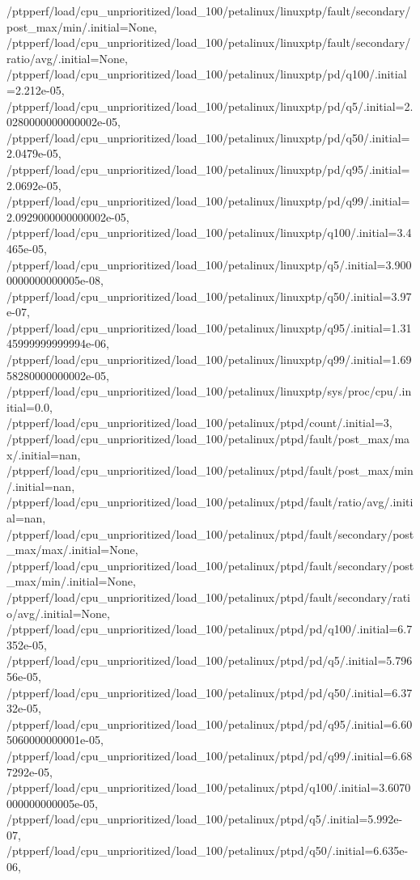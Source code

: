 {    /ptpperf/load/cpu_unprioritized/load_100/petalinux/linuxptp/fault/secondary/post_max/min/.initial=None,
    /ptpperf/load/cpu_unprioritized/load_100/petalinux/linuxptp/fault/secondary/ratio/avg/.initial=None,
    /ptpperf/load/cpu_unprioritized/load_100/petalinux/linuxptp/pd/q100/.initial=2.212e-05,
    /ptpperf/load/cpu_unprioritized/load_100/petalinux/linuxptp/pd/q5/.initial=2.0280000000000002e-05,
    /ptpperf/load/cpu_unprioritized/load_100/petalinux/linuxptp/pd/q50/.initial=2.0479e-05,
    /ptpperf/load/cpu_unprioritized/load_100/petalinux/linuxptp/pd/q95/.initial=2.0692e-05,
    /ptpperf/load/cpu_unprioritized/load_100/petalinux/linuxptp/pd/q99/.initial=2.0929000000000002e-05,
    /ptpperf/load/cpu_unprioritized/load_100/petalinux/linuxptp/q100/.initial=3.4465e-05,
    /ptpperf/load/cpu_unprioritized/load_100/petalinux/linuxptp/q5/.initial=3.9000000000000005e-08,
    /ptpperf/load/cpu_unprioritized/load_100/petalinux/linuxptp/q50/.initial=3.97e-07,
    /ptpperf/load/cpu_unprioritized/load_100/petalinux/linuxptp/q95/.initial=1.3145999999999994e-06,
    /ptpperf/load/cpu_unprioritized/load_100/petalinux/linuxptp/q99/.initial=1.6958280000000002e-05,
    /ptpperf/load/cpu_unprioritized/load_100/petalinux/linuxptp/sys/proc/cpu/.initial=0.0,
    /ptpperf/load/cpu_unprioritized/load_100/petalinux/ptpd/count/.initial=3,
    /ptpperf/load/cpu_unprioritized/load_100/petalinux/ptpd/fault/post_max/max/.initial=nan,
    /ptpperf/load/cpu_unprioritized/load_100/petalinux/ptpd/fault/post_max/min/.initial=nan,
    /ptpperf/load/cpu_unprioritized/load_100/petalinux/ptpd/fault/ratio/avg/.initial=nan,
    /ptpperf/load/cpu_unprioritized/load_100/petalinux/ptpd/fault/secondary/post_max/max/.initial=None,
    /ptpperf/load/cpu_unprioritized/load_100/petalinux/ptpd/fault/secondary/post_max/min/.initial=None,
    /ptpperf/load/cpu_unprioritized/load_100/petalinux/ptpd/fault/secondary/ratio/avg/.initial=None,
    /ptpperf/load/cpu_unprioritized/load_100/petalinux/ptpd/pd/q100/.initial=6.7352e-05,
    /ptpperf/load/cpu_unprioritized/load_100/petalinux/ptpd/pd/q5/.initial=5.79656e-05,
    /ptpperf/load/cpu_unprioritized/load_100/petalinux/ptpd/pd/q50/.initial=6.3732e-05,
    /ptpperf/load/cpu_unprioritized/load_100/petalinux/ptpd/pd/q95/.initial=6.605060000000001e-05,
    /ptpperf/load/cpu_unprioritized/load_100/petalinux/ptpd/pd/q99/.initial=6.687292e-05,
    /ptpperf/load/cpu_unprioritized/load_100/petalinux/ptpd/q100/.initial=3.6070000000000005e-05,
    /ptpperf/load/cpu_unprioritized/load_100/petalinux/ptpd/q5/.initial=5.992e-07,
    /ptpperf/load/cpu_unprioritized/load_100/petalinux/ptpd/q50/.initial=6.635e-06,
}
